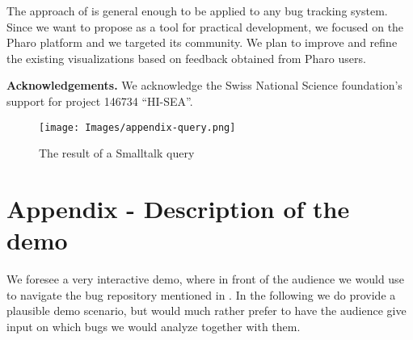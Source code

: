 The approach of \ib is general enough to be applied to any bug tracking system. Since we want to propose \ib as a tool for practical development, we focused on the Pharo platform and we targeted its community. We plan to improve \ib and refine the existing visualizations based on feedback obtained from Pharo users.


{\bf Acknowledgements.} We acknowledge the Swiss National Science foundation's support for project 146734 ``HI-SEA''.







\begin{figure*}[ht]
\centering
\texttt{[image: Images/appendix-query.png]}
\caption{The result  of a Smalltalk query}
\label{appendix-query}
\end{figure*}

\newpage


\section*{Appendix - Description of the demo}

We foresee a very interactive demo, where in front of the audience we would use \ib to navigate the bug repository mentioned in . In the following we do provide a plausible demo scenario, but would much rather prefer to have the audience give input on which bugs we would analyze together with them.

